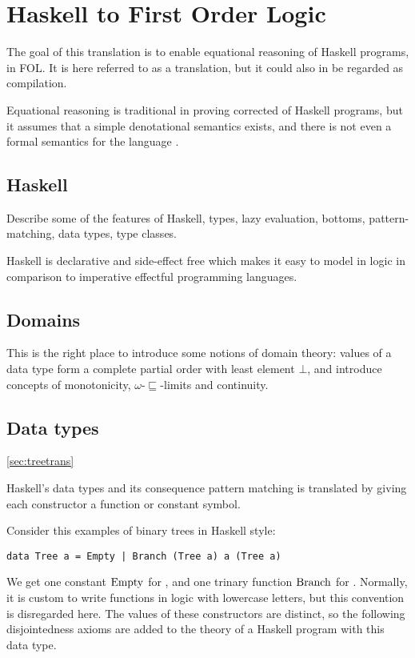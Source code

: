 \chapter{Haskell to First Order Logic}

The goal of this translation is to enable equational reasoning of
Haskell programs, in FOL. It is here referred to as a translation, but
it could also in be regarded as compilation.

Equational reasoning is traditional in proving corrected of Haskell
programs, but it assumes that a simple denotational semantics exists,
and there is not even a formal semantics for the language
\cite{chasingbot}.

\section{Haskell}

Describe some of the features of Haskell, types, lazy evaluation,
bottoms, pattern-matching, data types, type classes.

Haskell is declarative and side-effect free which makes it easy
to model in logic in comparison to imperative effectful programming languages.

\section{Domains}

This is the right place to introduce some notions of domain theory:
values of a data type form a complete partial order with least element
$\bot$, and introduce concepts of monotonicity,
$\omega$-$\sqsubseteq$-limits and continuity.

\section{Data types}
\ref{sec:treetrans}

Haskell's data types and its consequence pattern matching is
translated by giving each constructor a function or constant symbol.

Consider this examples of binary trees in Haskell style:

\begin{verbatim}
data Tree a = Empty | Branch (Tree a) a (Tree a)
\end{verbatim}

We get one constant $\mathrm{Empty}$ for , and one trinary
function $\mathrm{Branch}$ for . Normally, it is custom
to write functions in logic with lowercase letters, but this
convention is disregarded here. The values of these constructors are
distinct, so the following disjointedness axioms are added to the
theory of a Haskell program with this data type.

